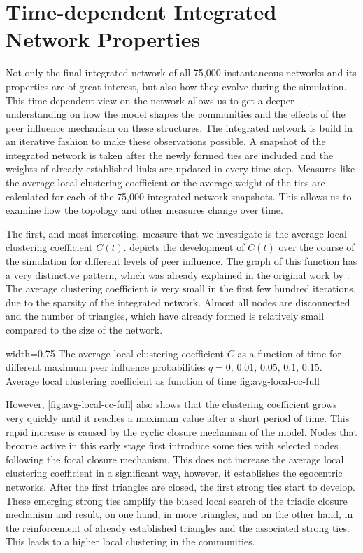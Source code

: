 

\section{Time-dependent Integrated Network Properties}
\label{sec:integrated-network-properties}

Not only the final integrated network of all 75,000 instantaneous networks and its properties are of great interest, but also how they evolve during the simulation.
This time-dependent view on the network allows us to get a deeper understanding on how the model shapes the communities and the effects of the peer influence mechanism on these structures.
The integrated network is build in an iterative fashion to make these observations possible.
A snapshot of the integrated network is taken after the newly formed ties are included and the weights of already established links are updated in every time step.
Measures like the average local clustering coefficient or the average weight of the ties are calculated for each of the 75,000 integrated network snapshots.
This allows us to examine how the topology and other measures change over time.

The first, and most interesting, measure that we investigate is the average local clustering coefficient \( C(t) \).
 depicts the development of \( C(t) \) over the course of the simulation for different levels of peer influence.
The graph of this function has a very distinctive pattern, which was already explained in the original work by \citet{Laurent2015}.
The average clustering coefficient is very small in the first few hundred iterations, due to the sparsity of the integrated network.
Almost all nodes are disconnected and the number of triangles, which have already formed is relatively small compared to the size of the network.


      {width=0.75\textwidth}
      {The average local clustering coefficient \( C \) as a function of time for different maximum peer influence probabilities \( q = 0, \, 0.01, \, 0.05, \, 0.1, \, 0.15\). }
      {Average local clustering coefficient as function of time}
      {fig:avg-local-cc-full}


However, \cref{fig:avg-local-cc-full} also shows that the clustering coefficient grows very quickly until it reaches a maximum value after a short period of time.
This rapid increase is caused by the cyclic closure mechanism of the model.
Nodes that become active in this early stage first introduce some ties with selected nodes following the focal closure mechanism.
This does not increase the average local clustering coefficient in a significant way, however, it establishes the egocentric networks.
After the first triangles are closed, the first strong ties start to develop.
These emerging strong ties amplify the biased local search of the triadic closure mechanism and result, on one hand, in more triangles, and on the other hand, in the reinforcement of already established triangles and the associated strong ties.
This leads to a higher local clustering in the communities.

